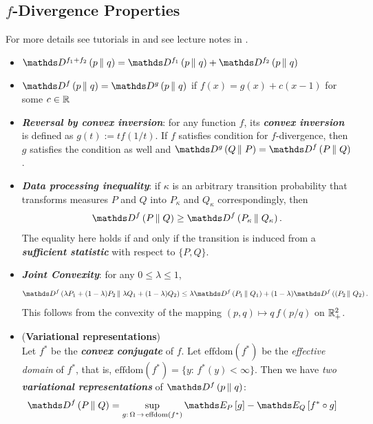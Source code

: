 \documentclass[11pt]{article}
\begin{document}
\subsection{$f$-Divergence Properties}
For more details see tutorials in \citep{csiszar2004information, liese2006divergences} and see lecture notes in \citep{polyanskiy2014lecture}.
\begin{itemize}
\item $\divg{f_1 + f_2}{p}{q} = \divg{f_1}{p}{q} + \divg{f_2}{p}{q}$

\item $\divg{f}{p}{q} = \divg{g}{p}{q}$ if $f(x) = g(x) + c(x-1)$ for some $c\in {\mathbb R}$

\item \emph{\textbf{Reversal by convex inversion}}: for any function $f$, its \emph{\textbf{convex inversion}} is defined as $g(t):=tf(1/t)$. If $f$ satisfies condition for $f$-divergence, then $g$ satisfies the condition as well and $\divg{g}{Q}{P} = \divg{f}{P}{Q}$.

\item \emph{\textbf{Data processing inequality}}: if $\kappa$ is an arbitrary transition probability that transforms measures $P$ and $Q$ into $P_{\kappa}$ and $Q_{\kappa}$ correspondingly, then
\begin{align}
\divg{f}{P}{Q} \geq \divg{f}{P_{\kappa }}{Q_{\kappa }}. \label{eqn: f_divg_data_processing_ineq}
\end{align} The equality here holds if and only if the transition is induced from a \emph{\textbf{sufficient statistic}} with respect to $\{P, Q\}$.

\item \textbf{\emph{Joint Convexity}}: for any $0 \le \lambda \le 1$, 
\begin{align}
\divg{f}{\lambda P_{1}+(1-\lambda )P_{2}}{\lambda Q_{1}+(1-\lambda )Q_{2}}  \leq \lambda\divg{f}{P_{1}}{Q_{1}}+ (1-\lambda) \divg{f}{(P_{2}}{Q_{2}}. \label{eqn: f_divg_convex}
\end{align} This follows from the convexity of the mapping $(p,q) \mapsto q\,f(p/q)$  on ${\mathbb R} _{+}^{2}$.

\item  
\begin{theorem} (\textbf{Variational representations}) \citep{polyanskiy2014lecture, wan2020f}\\
Let $f^{*}$ be the \emph{\textbf{convex conjugate}} of $f$. Let $\mathrm{effdom} (f^{*})$ be the \textit{effective domain} of $f^{*}$, that is,  $\mathrm {effdom} (f^{*})=\{y:\, f^{*}(y)<\infty \}$. Then we have \emph{two \textbf{variational representations}} of $\divg{f}{p}{q}$:
\begin{align}
\divg{f}{P}{Q} &= \sup _{g:\, \Omega\, \to \,\mathrm{effdom} (f^{*})} \E{P}{g} - \E{Q}{f^{*}\circ g} \label{eqn: f_divg_variational_representation}
\end{align}
\end{theorem}


\end{itemize}
\end{document}
